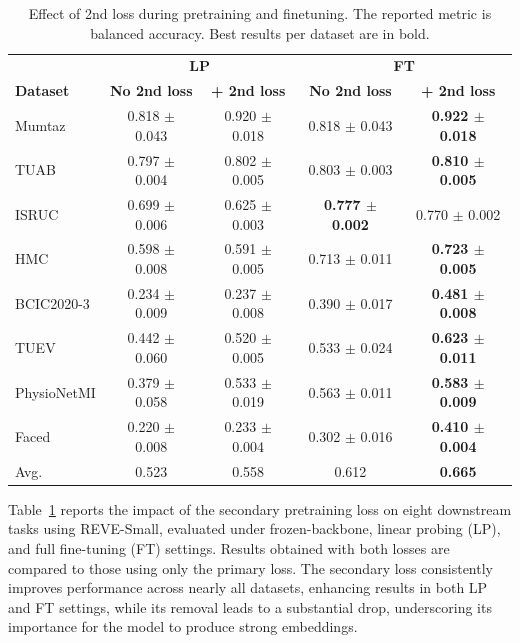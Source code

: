 \documentclass{article}
\begin{document}
\begin{table}[!ht]
    \centering
    \caption{Effect of 2nd loss during pretraining and finetuning. The reported metric is balanced accuracy. Best results per dataset are in bold.}
    \begin{tabular}{lcccc}
    \toprule

    & \multicolumn{2}{c}{\textbf{LP}} & \multicolumn{2}{c}{\textbf{FT}} \\
    \textbf{Dataset} & \textbf{No 2nd loss} & \textbf{+ 2nd loss }& \textbf{No 2nd loss} & \textbf{+ 2nd loss} \\ \midrule
        Mumtaz & 0.818 $\pm$ 0.043 & 0.920 $\pm$ 0.018 & 0.818 $\pm$ 0.043 & \textbf{0.922 $\pm$ 0.018} \\
        TUAB & 0.797 $\pm$ 0.004 & 0.802 $\pm$ 0.005 & 0.803 $\pm$ 0.003 & \textbf{0.810 $\pm$ 0.005} \\ 
        ISRUC & 0.699 $\pm$ 0.006 & 0.625 $\pm$ 0.003 & \textbf{0.777 $\pm$ 0.002} & 0.770 $\pm$ 0.002 \\
        HMC & 0.598 $\pm$ 0.008 & 0.591 $\pm$ 0.005 & 0.713 $\pm$ 0.011 & \textbf{0.723 $\pm$ 0.005} \\
        BCIC2020-3 & 0.234 $\pm$ 0.009 & 0.237 $\pm$ 0.008 & 0.390 $\pm$ 0.017 & \textbf{0.481 $\pm$ 0.008} \\
        TUEV & 0.442 $\pm$ 0.060 & 0.520 $\pm$ 0.005 & 0.533 $\pm$ 0.024 & \textbf{0.623 $\pm$ 0.011} \\ 
        PhysioNetMI & 0.379 $\pm$ 0.058 & 0.533 $\pm$ 0.019 & 0.563 $\pm$ 0.011 & \textbf{0.583 $\pm$ 0.009} \\
        Faced & 0.220 $\pm$ 0.008 & 0.233 $\pm$ 0.004 & 0.302 $\pm$ 0.016 & \textbf{0.410 $\pm$ 0.004} \\
        \midrule
        Avg. & 0.523 & 0.558 & 0.612 & \textbf{0.665} \\ \bottomrule
    \end{tabular}
    \label{tab:second_loss}
\end{table}

Table~\ref{tab:second_loss} reports the impact of the secondary pretraining loss on eight downstream tasks using REVE-Small, evaluated under frozen-backbone, linear probing (LP), and full fine-tuning (FT) settings. Results obtained with both losses are compared to those using only the primary loss. The secondary loss consistently improves performance across nearly all datasets, enhancing results in both LP and FT settings, while its removal leads to a substantial drop, underscoring its importance for the model to produce strong embeddings.
\end{document}
